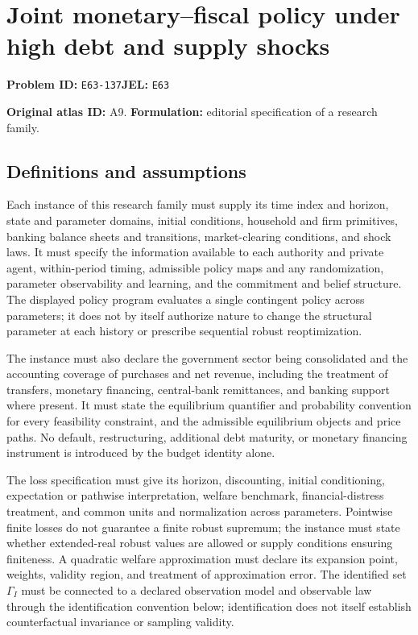 \documentclass[11pt,a4paper]{article}
\begin{document}
\section*{Joint monetary–fiscal policy under high debt and supply shocks}
\textbf{Problem ID:} \texttt{E63-137}\quad \textbf{JEL:} \texttt{E63}\par
\label{problem:OP-0019}
\label{atlas:prob:A9}

\noindent\textbf{Original atlas ID:} A9. \textbf{Formulation:} editorial specification of a research family.

\subsection*{Definitions and assumptions}

Each instance of this research family must supply its time index and horizon, state and parameter domains, initial conditions, household and firm primitives, banking balance sheets and transitions, market-clearing conditions, and shock laws. It must specify the information available to each authority and private agent, within-period timing, admissible policy maps and any randomization, parameter observability and learning, and the commitment and belief structure. The displayed policy program evaluates a single contingent policy across parameters; it does not by itself authorize nature to change the structural parameter at each history or prescribe sequential robust reoptimization.

The instance must also declare the government sector being consolidated and the accounting coverage of purchases and net revenue, including the treatment of transfers, monetary financing, central-bank remittances, and banking support where present. It must state the equilibrium quantifier and probability convention for every feasibility constraint, and the admissible equilibrium objects and price paths. No default, restructuring, additional debt maturity, or monetary financing instrument is introduced by the budget identity alone.

The loss specification must give its horizon, discounting, initial conditioning, expectation or pathwise interpretation, welfare benchmark, financial-distress treatment, and common units and normalization across parameters. Pointwise finite losses do not guarantee a finite robust supremum; the instance must state whether extended-real robust values are allowed or supply conditions ensuring finiteness. A quadratic welfare approximation must declare its expansion point, weights, validity region, and treatment of approximation error. The identified set $\Gamma_I$ must be connected to a declared observation model and observable law through the identification convention below; identification does not itself establish counterfactual invariance or sampling validity.
\end{document}

